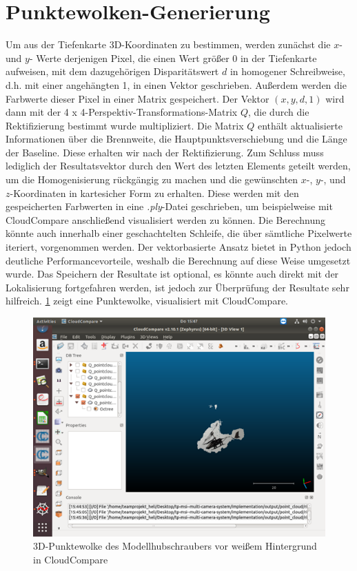 \section{Punktewolken-Generierung} 
\label{sec:pointgen}

Um aus der Tiefenkarte 3D-Koordinaten zu bestimmen, werden zunächst die $x$- und $y$- Werte derjenigen Pixel, die einen Wert größer 0 in der Tiefenkarte aufweisen, mit dem dazugehörigen Disparitätswert $d$ in homogener Schreibweise, d.h. mit einer angehängten 1, in einen Vektor geschrieben. Außerdem werden die Farbwerte dieser Pixel in einer Matrix gespeichert. Der Vektor $(x, y, d, 1)$ wird dann mit der 4 x 4-Perspektiv-Transformations-Matrix $Q$, die durch die Rektifizierung bestimmt wurde multipliziert. Die Matrix $Q$ enthält aktualisierte Informationen über die Brennweite, die Hauptpunktsverschiebung und die Länge der Baseline. Diese erhalten wir nach der Rektifizierung. Zum Schluss muss lediglich der Resultatsvektor durch den Wert des letzten Elements geteilt werden, um die Homogenisierung rückgängig zu machen und die gewünschten $x$-, $y$-, und $z$-Koordinaten in kartesicher Form zu erhalten. Diese werden mit den gespeicherten Farbwerten in eine \textit{.ply}-Datei geschrieben, um beispielweise mit CloudCompare anschließend visualisiert werden zu können.\newline
Die Berechnung könnte auch innerhalb einer geschachtelten Schleife, die über sämtliche Pixelwerte iteriert, vorgenommen werden. Der vektorbasierte Ansatz bietet in Python jedoch deutliche Performancevorteile, weshalb die Berechnung auf diese Weise umgesetzt wurde. Das Speichern der Resultate ist optional, es könnte auch direkt mit der Lokalisierung fortgefahren werden, ist jedoch zur Überprüfung der Resultate sehr hilfreich. \ref{fig:cloudresult} zeigt eine Punktewolke, visualisiert mit CloudCompare.

\begin{figure}[H]
	\includegraphics[scale=1.0]{bilder/cloud_result}
	\caption[3D-Punktewolke des Modellhubschraubers vor weißem Hintergrund in CloudCompare]{3D-Punktewolke des Modellhubschraubers vor weißem Hintergrund in CloudCompare}
	\label{fig:cloudresult}%
\end{figure}

